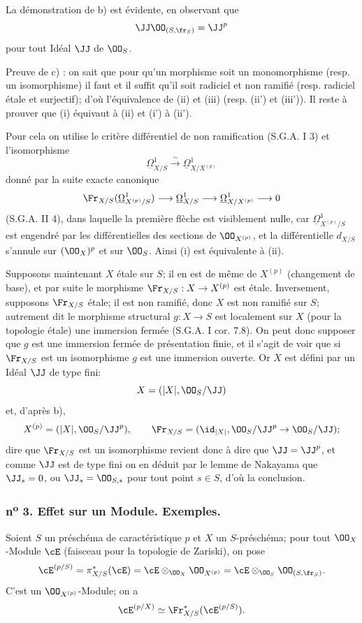 La démonstration de b) est évidente, en observant que
\[
\JJ\OO_{(S,\fr_S)}=\JJ^p
\]
pour tout Idéal $\JJ$ de $\OO_S$.

Preuve de c) : on sait que pour qu'un morphisme soit un
monomorphisme (resp. un isomorphisme) il faut et il suffit qu'il soit radiciel et non ramifié (resp. radiciel étale et surjectif); d'où l'équivalence de (ii) et (iii) (resp. (ii') et (iii')). Il reste à prouver que (i) équivaut à (ii) et (i') à (ii').

Pour cela on utilise le critère différentiel de non ramification (S.G.A. I 3) et l'isomorphisme
\[
\underline{\Omega}^1_{X/S}\xrightarrow{\sim} \underline{\Omega}^1_{X/X^{(p)}}
\]
donné par la suite exacte canonique
\[
\Fr_{X/S}(\underline{\Omega}^1_{X^{(p)}/S})\longrightarrow \underline{\Omega}^1_{X/S}
\longrightarrow \underline{\Omega}^1_{X/X^{(p)}}\longrightarrow 0
\]
(S.G.A. II 4), dans laquelle la première flèche est visiblement nulle, car $\underline{\Omega}^1_{X^{(p)}/S}$ est engendré par les différentielles des sections de $\OO_{X^{(p)}}$, et la différentielle $d_{X/S}$ s'annule sur $(\OO_X)^p$ et sur $\OO_S$. Ainsi (i) est équivalente à (ii).

Supposons maintenant $X$ étale sur $S$; il en est de même de $X^{(p)}$ (changement de base), et par suite le morphisme $\Fr_{X/S}:X\to X^{(p)}$ est étale. Inversement, supposons $\Fr_{X/S}$ étale; il est non ramifié, donc $X$ est non ramifié sur $S$; autrement dit le morphisme structural $g:X\to S$ est localement sur $X$ (pour la topologie étale) une immersion fermée (S.G.A. I cor. 7.8). On peut donc supposer que $g$ est une immersion fermée de présentation finie, et il s'agit de voir que si $\Fr_{X/S}$ est un isomorphisme $g$ est une immersion ouverte. Or $X$ est défini par un Idéal $\JJ$ de type fini:
\[
X=(|X|,\OO_S/\JJ)
\]
et, d'après b),
\[
X^{(p)}=(|X|,\OO_S/\JJ^p),
\qquad
\Fr_{X/S}=(\id_{|X|},\OO_S/\JJ^p\to\OO_S/\JJ);
\]
dire que $\Fr_{X/S}$ est un isomorphisme revient donc à dire que $\JJ=\JJ^p$, et comme $\JJ$ est de type fini on en déduit par le lemme de Nakayama que $\JJ_s=0$, ou $\JJ_s=\OO_{S,s}$ pour tout point $s\in S$, d'où la conclusion.

\subsubsection*{n\textsuperscript{o} 3. Effet sur un Module. Exemples.}

Soient $S$ un préschéma de caractéristique $p$ et $X$ un $S$-préschéma; pour tout $\OO_X$-Module $\cE$ (faisceau pour la topologie de Zariski), on pose
\[
\cE^{(p/S)}=\pi_{X/S}^*(\cE)=\cE\otimes_{\OO_X}\OO_{X^{(p)}}
 =\cE\otimes_{\OO_S}\OO_{(S,\fr_S)}.
\]
C'est un $\OO_{X^{(p)}}$-Module; on a
\[
\cE^{(p/X)}\simeq \Fr_{X/S}^*(\cE^{(p/S)}).
\]

